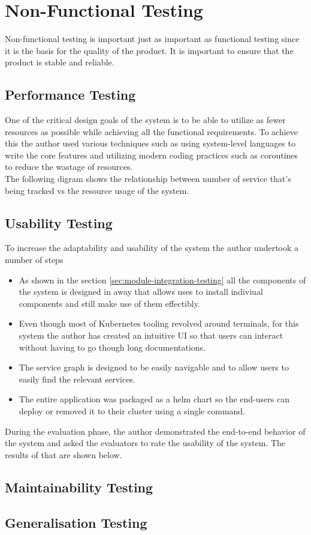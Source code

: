 \section{Non-Functional Testing}

Non-functional testing is important just as important as functional testing since it is the basis for the quality of the product. It is important to ensure that the product is stable and reliable.

\subsection{Performance Testing}

One of the critical design goals of the system is to be able to utilize as fewer resources as possible while achieving all the functional requirements. To achieve this the author used various techniques such as using system-level languages to write the core features and utilizing modern coding practices such as coroutines to reduce the wastage of resources.\\

\noindent The following digram shows the relationship between number of service that's being tracked vs the resource usage of the system.\\[6cm]



\subsection{Usability Testing}

To increase the adaptability and usability of the system the author undertook a number of steps

\begin{itemize}
    \item As shown in the section \ref{sec:module-integration-testing} all the components of the system is designed in away that allows uses to install indiviual components and still make use of them effectibly.
    \item Even though most of Kubernetes tooling revolved around terminals, for this system the author has created an intuitive UI so that users can interact without having to go though long documentations.
    \item The service graph is designed to be easily navigable and to allow users to easily find the relevant services.
    \item The entire application was packaged as a helm chart so the end-users can deploy or removed it to their cluster using a single command.

\end{itemize}


During the evaluation phase, the author demonstrated the end-to-end behavior of the system and asked the evaluators to rate the usability of the system. The results of that are shown below. \\[6cm]

\subsection{Maintainability Testing}





\subsection{Generalisation Testing}